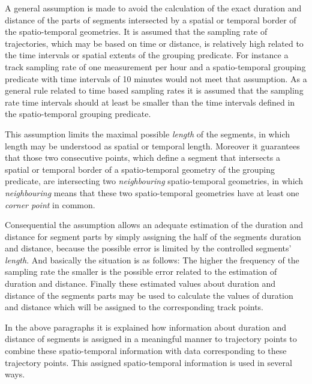 \documentclass[12pt, oneside, a4paper]{scrbook}
\begin{document}
A general assumption is made to avoid the calculation of the exact duration and distance of the parts of segments intersected by a spatial or temporal border of the spatio-temporal geometries. 
It is assumed that the sampling rate of trajectories, which may be based on time or distance, is relatively high related to the time intervals or spatial extents of the grouping predicate. 
For instance a track sampling rate of one measurement per hour and a spatio-temporal grouping predicate with time intervals of 10 minutes would not meet that assumption. 
As a general rule related to time based sampling rates it is assumed that the sampling rate time intervals should at least be smaller than the time intervals defined in the spatio-temporal grouping predicate. 
\par\medskip

This assumption limits the maximal possible \textit{length} of the segments, in which length may be understood as spatial or temporal length.
Moreover it guarantees that those two consecutive points, which define a segment that intersects a spatial or temporal border of a spatio-temporal geometry of the grouping predicate, are intersecting two \textit{neighbouring} spatio-temporal geometries, in which \textit{neighbouring} means that these two spatio-temporal geometries have at least one \textit{corner point} in common.
\par\medskip

Consequential the assumption allows an adequate estimation of the duration and distance for segment parts by simply assigning the half of the segments duration and distance, because the possible error is limited by the controlled segments' \textit{length}. And basically the situation is as follows: The higher the frequency of the sampling rate the smaller is the possible error related to the estimation of duration and distance.
Finally these estimated values about duration and distance of the segments parts may be used to calculate the values of duration and distance which will be assigned to the corresponding track points.
\par\medskip


In the above paragraphs it is explained how information about duration and distance of segments is assigned in a meaningful manner to trajectory points to combine these spatio-temporal information with data corresponding to these trajectory points. This assigned spatio-temporal information is used in several ways.
\par\medskip
\end{document}
